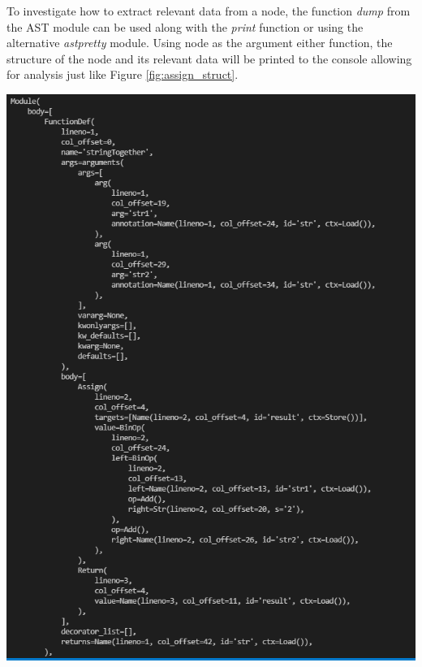 \documentclass{l4proj}
\begin{document}
To investigate how to extract relevant data from a node, the function \textit{dump} from the AST module can be used along with the \textit{print} function or using the alternative \textit{astpretty} module\cite{pretty}. Using node as the argument either function, the structure of the node and its relevant data will be printed to the console allowing for analysis just like Figure \ref{fig:assign_struct}.

\begin{center}
    \includegraphics[width=\textwidth,height=\textheight,keepaspectratio]{images/AST_class.png}
    \label{fig:assign_struct}
\end{center}
\end{document}
